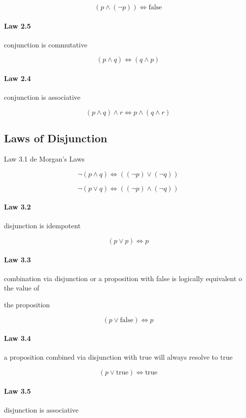 \documentclass[twocolumn]{article}
\begin{document}
$$ (p  \wedge  ( \neg p))  \iff  \text{false} $$

\paragraph{Law 2.5} conjunction is commutative

$$ (p  \wedge  q)  \iff  (q  \wedge  p) $$

\paragraph{Law 2.4} conjunction is associative

$$ (p  \wedge  q)  \wedge  r  \iff  p  \wedge  (q  \wedge  r) $$

\subsection{Laws of Disjunction}

Law 3.1 de Morgan’s Laws

$$ \neg (p  \wedge  q)  \iff  (( \neg p)  \vee  ( \neg q)) $$

$$ \neg (p  \vee  q)  \iff  (( \neg p)  \wedge  ( \neg q)) $$

\paragraph{Law 3.2} disjunction is idempotent

$$ (p  \vee  p)  \iff  p $$

\paragraph{Law 3.3} combination via disjunction or a proposition with false is logically equivalent o the value of

the proposition

$$ (p  \vee  \text{false})  \iff  p $$

\paragraph{Law 3.4} a proposition combined via disjunction with true will always resolve to true

$$ (p  \vee  \text{true})  \iff  \text{true} $$

\paragraph{Law 3.5} disjunction is associative
\end{document}
